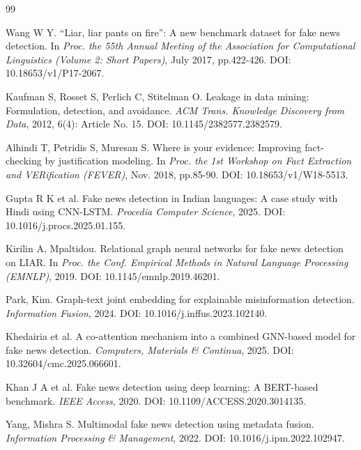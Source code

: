 \documentclass[10pt,twocolumn,twoside,a4paper]{article}
\begin{document}
\begin{thebibliography}{99}
\footnotesize

Wang W Y. ``Liar, liar pants on fire'': A new benchmark dataset for fake news
detection. In \emph{Proc. the 55th Annual Meeting of the Association for
Computational Linguistics (Volume 2: Short Papers)}, July 2017, pp.422-426.
DOI: 10.18653/v1/P17-2067.

Kaufman S, Rosset S, Perlich C, Stitelman O. Leakage in data mining:
Formulation, detection, and avoidance. \emph{ACM Trans. Knowledge Discovery
from Data}, 2012, 6(4): Article No. 15. DOI: 10.1145/2382577.2382579.

Alhindi T, Petridis S, Muresan S. Where is your evidence: Improving
fact-checking by justification modeling. In \emph{Proc. the 1st Workshop on
Fact Extraction and VERification (FEVER)}, Nov. 2018, pp.85-90.
DOI: 10.18653/v1/W18-5513.

Gupta R K et al. Fake news detection in Indian languages: A case study with
Hindi using CNN-LSTM. \emph{Procedia Computer Science}, 2025.
DOI: 10.1016/j.procs.2025.01.155.

Kirilin A, Mpaltidou. Relational graph neural networks for fake news detection
on LIAR. In \emph{Proc. the Conf. Empirical Methods in Natural Language
Processing (EMNLP)}, 2019. DOI: 10.1145/emnlp.2019.46201.

Park, Kim. Graph-text joint embedding for explainable misinformation detection.
\emph{Information Fusion}, 2024. DOI: 10.1016/j.inffus.2023.102140.

Khedairia et al. A co-attention mechanism into a combined GNN-based model for
fake news detection. \emph{Computers, Materials \& Continua}, 2025.
DOI: 10.32604/cmc.2025.066601.

Khan J A et al. Fake news detection using deep learning: A BERT-based
benchmark. \emph{IEEE Access}, 2020. DOI: 10.1109/ACCESS.2020.3014135.

Yang, Mishra S. Multimodal fake news detection using metadata fusion.
\emph{Information Processing \& Management}, 2022.
DOI: 10.1016/j.ipm.2022.102947.


\end{thebibliography}
\end{document}
